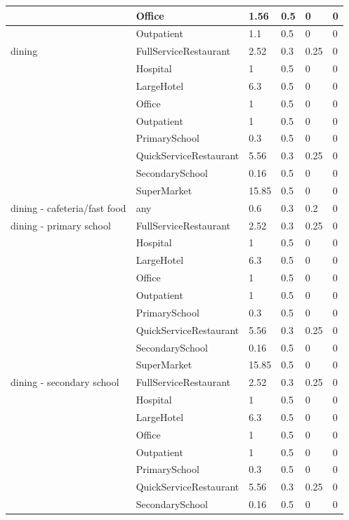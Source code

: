 \begin{center}
\begin{longtable}{|p{2.2in}|p{1.3in}|p{0.7in}|p{0.6in}|p{0.6in}|p{0.6in}|}
 & Office & 1.56 & 0.5 & 0 & 0 \\ \hline
 & Outpatient & 1.1 & 0.5 & 0 & 0 \\ \hline
dining & FullServiceRestaurant & 2.52 & 0.3 & 0.25 & 0 \\ \hline
 & Hospital & 1 & 0.5 & 0 & 0 \\ \hline
 & LargeHotel & 6.3 & 0.5 & 0 & 0 \\ \hline
 & Office & 1 & 0.5 & 0 & 0 \\ \hline
 & Outpatient & 1 & 0.5 & 0 & 0 \\ \hline
 & PrimarySchool & 0.3 & 0.5 & 0 & 0 \\ \hline
 & QuickServiceRestaurant & 5.56 & 0.3 & 0.25 & 0 \\ \hline
 & SecondarySchool & 0.16 & 0.5 & 0 & 0 \\ \hline
 & SuperMarket & 15.85 & 0.5 & 0 & 0 \\ \hline
dining - cafeteria/fast food & any & 0.6 & 0.3 & 0.2 & 0 \\ \hline
dining - primary school & FullServiceRestaurant & 2.52 & 0.3 & 0.25 & 0 \\ \hline
 & Hospital & 1 & 0.5 & 0 & 0 \\ \hline
 & LargeHotel & 6.3 & 0.5 & 0 & 0 \\ \hline
 & Office & 1 & 0.5 & 0 & 0 \\ \hline
 & Outpatient & 1 & 0.5 & 0 & 0 \\ \hline
 & PrimarySchool & 0.3 & 0.5 & 0 & 0 \\ \hline
 & QuickServiceRestaurant & 5.56 & 0.3 & 0.25 & 0 \\ \hline
 & SecondarySchool & 0.16 & 0.5 & 0 & 0 \\ \hline
 & SuperMarket & 15.85 & 0.5 & 0 & 0 \\ \hline
dining - secondary school & FullServiceRestaurant & 2.52 & 0.3 & 0.25 & 0 \\ \hline
 & Hospital & 1 & 0.5 & 0 & 0 \\ \hline
 & LargeHotel & 6.3 & 0.5 & 0 & 0 \\ \hline
 & Office & 1 & 0.5 & 0 & 0 \\ \hline
 & Outpatient & 1 & 0.5 & 0 & 0 \\ \hline
 & PrimarySchool & 0.3 & 0.5 & 0 & 0 \\ \hline
 & QuickServiceRestaurant & 5.56 & 0.3 & 0.25 & 0 \\ \hline
 & SecondarySchool & 0.16 & 0.5 & 0 & 0 \\ \hline

\end{longtable}
\end{center}
